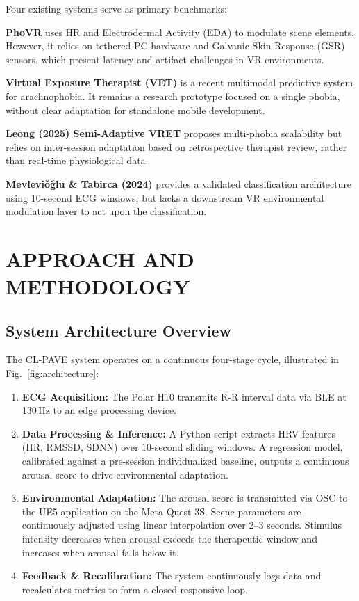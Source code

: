 \documentclass[conference]{IEEEtran}
\begin{document}
Four existing systems serve as primary benchmarks:

\textbf{PhoVR} \cite{orozco2024} uses HR and Electrodermal Activity (EDA) to modulate scene elements. However, it relies on tethered PC hardware and Galvanic Skin Response (GSR) sensors, which present latency and artifact challenges in VR environments.

\textbf{Virtual Exposure Therapist (VET)} \cite{vet2025} is a recent multimodal predictive system for arachnophobia. It remains a research prototype focused on a single phobia, without clear adaptation for standalone mobile development.

\textbf{Leong (2025) Semi-Adaptive VRET} \cite{leong2025} proposes multi-phobia scalability but relies on inter-session adaptation based on retrospective therapist review, rather than real-time physiological data.

\textbf{Mevlevi\v{o}\v{g}lu \& Tabirca (2024)} \cite{mevlevio2024} provides a validated classification architecture using 10-second ECG windows, but lacks a downstream VR environmental modulation layer to act upon the classification.

\section{APPROACH AND METHODOLOGY}

\subsection{System Architecture Overview}

The CL-PAVE system operates on a continuous four-stage cycle, illustrated in Fig.~\ref{fig:architecture}:

\begin{enumerate}
    \item \textbf{ECG Acquisition:} The Polar H10 transmits R-R interval data via BLE at 130\,Hz to an edge processing device.
    \item \textbf{Data Processing \& Inference:} A Python script extracts HRV features (HR, RMSSD, SDNN) over 10-second sliding windows. A regression model, calibrated against a pre-session individualized baseline, outputs a continuous arousal score to drive environmental adaptation.
    \item \textbf{Environmental Adaptation:} The arousal score is transmitted via OSC to the UE5 application on the Meta Quest 3S. Scene parameters are continuously adjusted using linear interpolation over 2--3 seconds. Stimulus intensity decreases when arousal exceeds the therapeutic window and increases when arousal falls below it.
    \item \textbf{Feedback \& Recalibration:} The system continuously logs data and recalculates metrics to form a closed responsive loop.
\end{enumerate}
\end{document}
